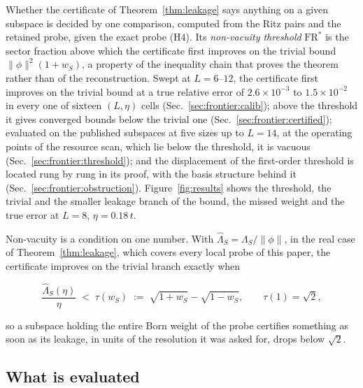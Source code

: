 %
%
%
%
Whether the certificate of Theorem~\ref{thm:leakage} says anything on a given subspace is decided by
one comparison, computed from the Ritz pairs and the retained probe, given the exact probe (H4). Its
\emph{non-vacuity threshold} $\mathrm{FR}^{\ast}$ is the sector fraction above which the certificate
first improves on the trivial bound $\lVert\phi\rVert^{2}(1+w_S)$, a property of the
inequality chain that proves the theorem rather than of the reconstruction. Swept at $L=6$--$12$, the
certificate first improves on the trivial bound at a true relative error of $2.6\times10^{-3}$ to
$1.5\times10^{-2}$ in every one of sixteen $(L,\eta)$ cells (Sec.~\ref{sec:frontier:calib}); above the
threshold it gives converged bounds below the trivial one (Sec.~\ref{sec:frontier:certified});
evaluated on the published subspaces at five sizes up to $L=14$, at the operating points of the
resource scan, which lie below the threshold, it is vacuous (Sec.~\ref{sec:frontier:threshold}); and the
displacement of the first-order threshold is located rung by rung in its proof, with the basis structure behind it
(Sec.~\ref{sec:frontier:obstruction}). Figure~\ref{fig:results} shows the threshold, the trivial
and the smaller leakage branch of the bound, the missed weight and the true error at $L=8$, $\eta=0.18\,t$.

Non-vacuity is a condition on one number. With $\widehat\Lambda_S=\Lambda_S/\lVert\phi\rVert$, in the
real case of Theorem~\ref{thm:leakage}, which covers every local probe of this paper, the certificate improves
on the trivial branch exactly when
\begin{widetext}
\begin{equation}
\frac{\widehat\Lambda_S(\eta)}{\eta}\;<\;\tau(w_S)\;:=\;\sqrt{1+w_S}-\sqrt{1-w_S},
\qquad \tau(1)=\sqrt2 ,
\label{eq:tau}
\end{equation}
\end{widetext}
so a subspace holding the entire Born weight of the probe certifies something as soon as its leakage,
in units of the resolution it was asked for, drops below $\sqrt2$.

\subsection{What is evaluated}
\label{sec:frontier:hyp}


